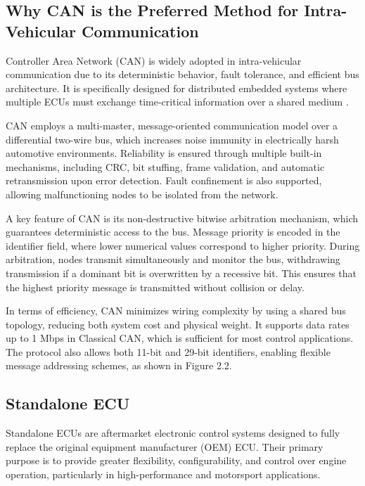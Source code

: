 \subsection{Why CAN is the Preferred Method for Intra-Vehicular Communication}

Controller Area Network (CAN) is widely adopted in intra-vehicular communication due to its deterministic behavior, fault tolerance, and efficient bus architecture. It is specifically designed for distributed embedded systems where multiple ECUs must exchange time-critical information over a shared medium \cite{bosch}.

CAN employs a multi-master, message-oriented communication model over a differential two-wire bus, which increases noise immunity in electrically harsh automotive environments. Reliability is ensured through multiple built-in mechanisms, including CRC, bit stuffing, frame validation, and automatic retransmission upon error detection. Fault confinement is also supported, allowing malfunctioning nodes to be isolated from the network.

A key feature of CAN is its non-destructive bitwise arbitration mechanism, which guarantees deterministic access to the bus. Message priority is encoded in the identifier field, where lower numerical values correspond to higher priority. During arbitration, nodes transmit simultaneously and monitor the bus, withdrawing transmission if a dominant bit is overwritten by a recessive bit. This ensures that the highest priority message is transmitted without collision or delay.

In terms of efficiency, CAN minimizes wiring complexity by using a shared bus topology, reducing both system cost and physical weight. It supports data rates up to 1 Mbps in Classical CAN, which is sufficient for most control applications. The protocol also allows both 11-bit and 29-bit identifiers, enabling flexible message addressing schemes, as shown in Figure 2.2.

\subsection{Standalone ECU}

Standalone ECUs are aftermarket electronic control systems designed to fully replace the original equipment manufacturer (OEM) ECU. Their primary purpose is to provide greater flexibility, configurability, and control over engine operation, particularly in high-performance and motorsport applications.

